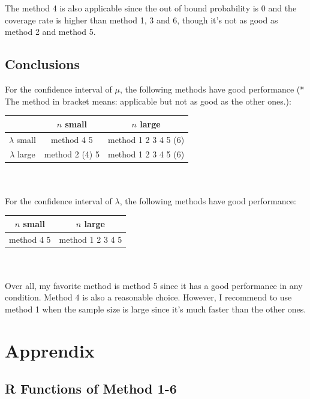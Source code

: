 \documentclass[12pt]{article}
\begin{document}
The method 4 is also applicable since the out of bound probability is 0 and the coverage rate is higher than method 1, 3 and 6, though it's not as good as method 2 and method 5.\\

\subsection{Conclusions}

For the confidence interval of $\mu$, the following methods have good performance (* The method in bracket means: applicable but not as good as the other ones.):\\

\begin{tabular}{|c|c|c|}
\hline
  & $n$ small & $n$ large\\
 \hline
$\lambda$ small & method 4  5 &  method 1 2 3 4 5 (6)\\
$\lambda$ large & method 2 (4) 5 & method 1 2 3 4 5 (6)\\
\hline
\end{tabular}
\\
\\

For the confidence interval of $\lambda$, the following methods have good performance:\\

\begin{tabular}{|c|c|}
\hline
  $n$ small & $n$ large\\
 \hline
method 4 5  &  method 1 2 3 4 5\\
\hline
\end{tabular}
\\
\\

Over all, my favorite method is method 5 since it has a good performance in any condition.  Method 4 is also a reasonable choice. However, I recommend to use method 1 when the sample size is large since it's much faster than the other ones. \\

\newpage

\section{Apprendix}
\subsection{R Functions of Method 1-6}
\end{document}
